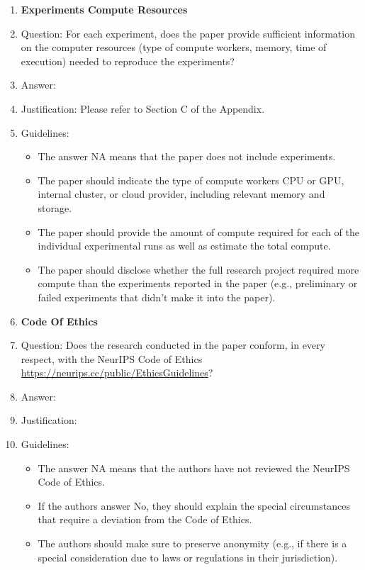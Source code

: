 \documentclass{article}
\begin{document}
\begin{enumerate}
\item {\bf Experiments Compute Resources}
    \item[] Question: For each experiment, does the paper provide sufficient information on the computer resources (type of compute workers, memory, time of execution) needed to reproduce the experiments?
    \item[] Answer: \answerYes{} %
    \item[] Justification: Please refer to Section C of the Appendix.
    \item[] Guidelines:
    \begin{itemize}
        \item The answer NA means that the paper does not include experiments.
        \item The paper should indicate the type of compute workers CPU or GPU, internal cluster, or cloud provider, including relevant memory and storage.
        \item The paper should provide the amount of compute required for each of the individual experimental runs as well as estimate the total compute. 
        \item The paper should disclose whether the full research project required more compute than the experiments reported in the paper (e.g., preliminary or failed experiments that didn't make it into the paper). 
    \end{itemize}
    
\item {\bf Code Of Ethics}
    \item[] Question: Does the research conducted in the paper conform, in every respect, with the NeurIPS Code of Ethics \url{https://neurips.cc/public/EthicsGuidelines}?
    \item[] Answer: \answerYes{} %
    \item[] Justification: \answerNA{}
    \item[] Guidelines:
    \begin{itemize}
        \item The answer NA means that the authors have not reviewed the NeurIPS Code of Ethics.
        \item If the authors answer No, they should explain the special circumstances that require a deviation from the Code of Ethics.
        \item The authors should make sure to preserve anonymity (e.g., if there is a special consideration due to laws or regulations in their jurisdiction).
    \end{itemize}



\end{enumerate}
\end{document}
